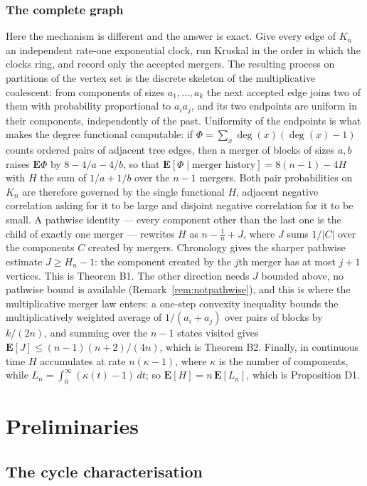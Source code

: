 \documentclass[10pt,a4paper]{amsart}
\newcommand{\E}{\mathbf{E}}
\DeclareMathOperator{\dg}{deg}
\begin{document}
\subsubsection*{The complete graph}
Here the mechanism is different and the answer is exact. Give every edge of
$K_n$ an independent rate-one exponential clock, run Kruskal in the order in
which the clocks ring, and record only the accepted mergers. The resulting
process on partitions of the vertex set is the discrete skeleton of the
multiplicative coalescent: from components of sizes $a_1,\dots,a_k$ the next
accepted edge joins two of them with probability proportional to $a_ia_j$, and
its two endpoints are uniform in their components, independently of the past.
Uniformity of the endpoints is what makes the degree functional computable: if
$\Phi=\sum_x\dg(x)(\dg(x)-1)$ counts ordered pairs of adjacent tree edges, then
a merger of blocks of sizes $a,b$ raises $\E\Phi$ by $8-4/a-4/b$, so that
$\E[\Phi\mid\text{merger history}]=8(n-1)-4H$ with $H$ the sum of $1/a+1/b$ over
the $n-1$ mergers. Both pair probabilities on $K_n$ are therefore governed by
the single functional $H$, adjacent negative correlation asking for it to be
large and disjoint negative correlation for it to be small. A pathwise identity
--- every component other than the last one is the child of exactly one merger
--- rewrites $H$ as $n-\frac1n+J$, where $J$ sums $1/|C|$ over the components $C$
created by mergers. Chronology gives the sharper pathwise estimate
$J\ge H_n-1$: the component created by the $j$th merger has at most $j+1$
vertices. This is Theorem B1. The other direction
needs $J$ bounded above, no pathwise bound is available
(Remark~\ref{rem:notpathwise}), and this is where the multiplicative merger law
enters: a one-step convexity inequality bounds the multiplicatively weighted
average of $1/(a_i+a_j)$ over pairs of blocks by $k/(2n)$, and summing over the
$n-1$ states visited gives $\E[J]\le(n-1)(n+2)/(4n)$, which is Theorem B2.
Finally, in continuous time $H$ accumulates at rate $n(\kappa-1)$, where
$\kappa$ is the number of components, while $L_n=\int_0^\infty(\kappa(t)-1)\,dt$;
so $\E[H]=n\,\E[L_n]$, which is Proposition D1.

\section{Preliminaries}
\label{sec:prelim}

\subsection{The cycle characterisation}
\end{document}
